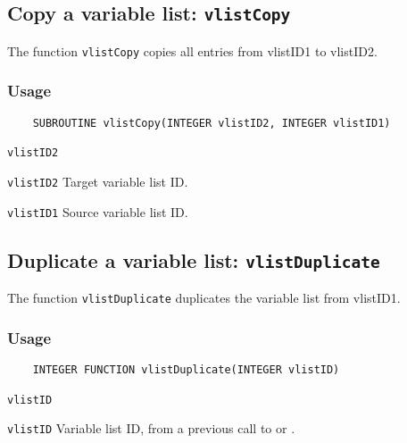 \subsection{Copy a variable list: \texttt{vlistCopy}}
\label{vlistCopy}

The function {\texttt{vlistCopy}} copies all entries from vlistID1 to vlistID2.

\subsubsection*{Usage}

\begin{verbatim}
    SUBROUTINE vlistCopy(INTEGER vlistID2, INTEGER vlistID1)
\end{verbatim}

\hspace*{4mm}\begin{minipage}[]{15cm}
\begin{deflist}{\texttt{vlistID2}\ }
\item[\texttt{vlistID2}]
Target variable list ID.
\item[\texttt{vlistID1}]
Source variable list ID.

\end{deflist}
\end{minipage}


\subsection{Duplicate a variable list: \texttt{vlistDuplicate}}
\label{vlistDuplicate}

The function {\texttt{vlistDuplicate}} duplicates the variable list from vlistID1.

\subsubsection*{Usage}

\begin{verbatim}
    INTEGER FUNCTION vlistDuplicate(INTEGER vlistID)
\end{verbatim}

\hspace*{4mm}\begin{minipage}[]{15cm}
\begin{deflist}{\texttt{vlistID}\ }
\item[\texttt{vlistID}]
Variable list ID, from a previous call to {} or {}.

\end{deflist}
\end{minipage}

